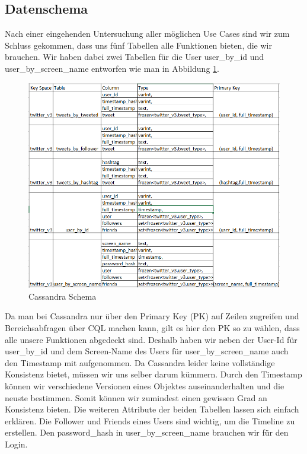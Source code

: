 \subsection{Datenschema}
\label{subsec:schema}
Nach einer eingehenden Untersuchung aller möglichen Use Cases sind wir zum Schluss gekommen, dass uns fünf Tabellen alle Funktionen bieten, die wir brauchen. Wir haben dabei zwei Tabellen für die User user\_by\_id und user\_by\_screen\_name entworfen wie man in Abbildung \ref{fig:schema}.
\begin{figure}[htbp!]
	\centering
	\includegraphics[scale=0.725]{pics/schema.PNG}
	\caption{Cassandra Schema}
	\label{fig:schema}
\end{figure}
Da man bei Cassandra nur über den Primary Key (PK) auf Zeilen zugreifen und Bereichsabfragen über CQL machen kann, gilt es hier den PK so zu wählen, dass alle unsere Funktionen abgedeckt sind. Deshalb haben wir neben der User-Id für user\_by\_id und dem Screen-Name des Users für user\_by\_screen\_name auch den Timestamp mit aufgenommen. Da Cassandra leider keine vollständige Konsistenz bietet, müssen wir uns selber darum kümmern. Durch den Timestamp können wir verschiedene Versionen eines Objektes auseinanderhalten und die neuste bestimmen. Somit können wir zumindest einen gewissen Grad an Konsistenz bieten. Die weiteren Attribute der beiden Tabellen lassen sich einfach erklären. Die Follower und Friends eines Users sind wichtig, um die Timeline zu erstellen. Den password\_hash in user\_by\_screen\_name brauchen wir für den Login.\\
